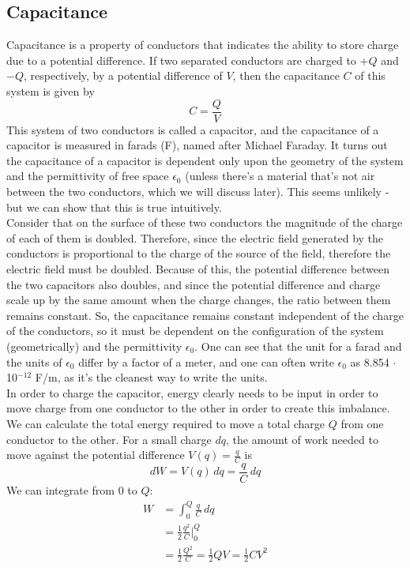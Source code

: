 \subsection{Capacitance}
Capacitance is a property of conductors that indicates the ability to store charge due to a potential difference. If two separated conductors are charged to $+Q$ and $-Q$, respectively, by a potential difference of $V$, then the capacitance $C$ of this system is given by 
\[
	C = \frac{Q}{V}
\]
This system of two conductors is called a capacitor, and the capacitance of a capacitor is measured in farads (F), named after Michael Faraday. It turns out the capacitance of a capacitor is dependent only upon the geometry of the system and the permittivity of free space $\epsilon_0$ (unless there's a material that's not air between the two conductors, which we will discuss later). This seems unlikely - but we can show that this is true intuitively. \\
Consider that on the surface of these two conductors the magnitude of the charge of each of them is doubled. Therefore, since the electric field generated by the conductors is proportional to the charge of the source of the field, therefore the electric field must be doubled. Because of this, the potential difference between the two capacitors also doubles, and since the potential difference and charge scale up by the same amount when the charge changes, the ratio between them remains constant. So, the capacitance remains constant independent of the charge of the conductors, so it must be dependent on the configuration of the system (geometrically) and the permittivity $\epsilon_0$. One can see that the unit for a farad and the units of $\epsilon_0$ differ by a factor of a meter, and one can often write $\epsilon_0$ as 8.854 $\cdot$ 10$^{-12}$ F/m, as it's the cleanest way to write the units. \\
In order to charge the capacitor, energy clearly needs to be input in order to move charge from one conductor to the other in order to create this imbalance. We can calculate the total energy required to move a total charge $Q$ from one conductor to the other. For a small charge $dq$, the amount of work needed to move against the potential difference $V(q) = \frac{q}{C}$ is 
\[
	dW = V(q) \, dq = \frac{q}{C} \, dq
\]
We can integrate from $0$ to $Q$: 
\begin{align*}
	W &= \int_0^Q \frac{q}{C} \, dq \\
	&= \frac{1}{2} \frac{q^2}{C} \Big|_0^Q\\
	&= \frac{1}{2} \frac{Q^2}{C} = \frac{1}{2}QV = \frac{1}{2}CV^2
\end{align*}
